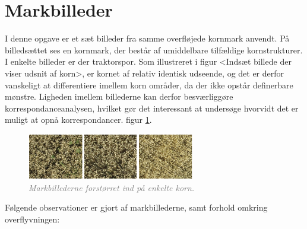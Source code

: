 \section{Markbilleder}
I denne opgave er et sæt billeder fra samme overfløjede kornmark anvendt. På billedsættet ses en kornmark, der består af umiddelbare tilfældige kornstrukturer. I enkelte billeder er der traktorspor. Som illustreret i figur <Indsæt billede der viser udsnit af korn>, er kornet af relativ identisk udseende, og det er derfor vanskeligt at differentiere imellem korn områder, da der ikke opstår definerbare mønstre. Ligheden imellem billederne kan derfor besværliggøre korrespondanceanalysen, hvilket gør det interessant at undersøge hvorvidt det er muligt at opnå korrespondancer.
 figur \ref{fig:korn}.
\begin{figure}[H]
    \centering
    \includegraphics[width=0.65\textwidth]{fig/20.png}
     \vspace{-1em}
    \begin{center}    
       \caption{\textcolor{gray}{\footnotesize \textit{Markbillederne forstørret ind på enkelte korn.}}}
    \label{fig:korn}
     \end{center}
     \vspace{-2.5em}
  \end{figure} \noindent
Følgende observationer er gjort af markbillederne, samt forhold omkring overflyvningen:
